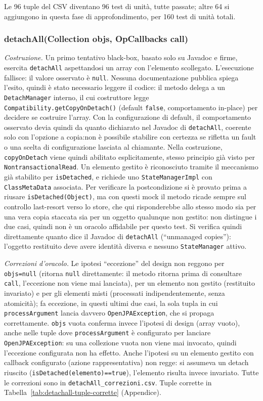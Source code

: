 Le 96 tuple del CSV diventano 96 test di unità, tutte passate; altre 64 si aggiungono in questa
fase di approfondimento, per 160 test di unità totali.

\subsubsection{detachAll(Collection objs, OpCallbacks call)}

\textit{Costruzione.} Un primo tentativo black-box, basato solo su Javadoc e firme, esercita
\texttt{detachAll} aspettandosi un array con l'elemento scollegato. L'esecuzione fallisce: il
valore osservato è \texttt{null}. Nessuna documentazione pubblica spiega l'esito, quindi è stato
necessario leggere il codice: il metodo delega a un \texttt{DetachManager} interno, il cui
costruttore legge \texttt{Compatibility.getCopyOnDetach()} (default \texttt{false}, comportamento
in-place) per decidere se costruire l'array. Con la configurazione di default, il comportamento
osservato devia quindi da quanto dichiarato nel Javadoc di \texttt{detachAll}, coerente solo con
l'opzione a copia:non è possibile stabilire con
certezza se rifletta un fault o una scelta di configurazione lasciata al chiamante. Nella
costruzione, \texttt{copyOnDetach} viene quindi abilitato esplicitamente, stesso principio già
visto per \texttt{NontransactionalRead}. Un elemento gestito è
riconosciuto tramite il meccanismo già stabilito per \texttt{isDetached}, e richiede uno
\texttt{StateManagerImpl} con \texttt{ClassMetaData} associata. Per verificare la postcondizione
si è provato prima a riusare \texttt{isDetached(Object)}, ma con questi mock il metodo ricade
sempre sul controllo last-resort verso lo store, che qui risponderebbe allo stesso modo sia per
una vera copia staccata sia per un oggetto qualunque non gestito: non distingue i due casi, quindi
non è un oracolo affidabile per questo test. Si verifica quindi direttamente quanto dice il
Javadoc di \texttt{detachAll} (``unmanaged copies''): l'oggetto restituito deve avere identità
diversa e nessuno \texttt{StateManager} attivo.

\textit{Correzioni d'oracolo.} Le ipotesi ``eccezione'' del design non reggono per
\texttt{objs=null} (ritorna \texttt{null} direttamente: il metodo ritorna prima di consultare
\texttt{call}, l'eccezione non viene mai lanciata), per un elemento non gestito (restituito
invariato) e per gli elementi misti (processati indipendentemente, senza atomicità); fa
eccezione, in questi ultimi due casi, la sola tupla in cui \texttt{processArgument} lancia
davvero \texttt{OpenJPAException}, che si propaga correttamente. \texttt{objs} vuota conferma
invece l'ipotesi di design (array vuoto), anche nelle tuple dove \texttt{processArgument} è
configurato per lanciare \texttt{OpenJPAException}: su una collezione vuota non viene mai
invocato, quindi l'eccezione configurata non ha effetto. Anche l'ipotesi su un elemento gestito
con callback configurato (azione rappresentativa) non regge: si assumeva un detach riuscito
(\texttt{isDetached(elemento)==true}), l'elemento risulta invece invariato. Tutte le correzioni sono in
\texttt{detachAll\_correzioni.csv}. Tuple corrette in Tabella~\ref{tab:detachall-tuple-corrette}
(Appendice).

